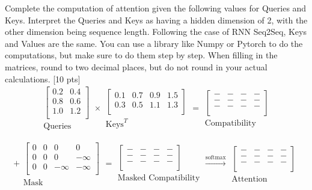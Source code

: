 \documentclass[11pt]{article}
\begin{document}
\vspace{2em}
 Complete the computation of attention given the following values for Queries and Keys. Interpret the Queries and Keys as having a hidden dimension of 2, with the other dimension being sequence length. Following the case of RNN Seq2Seq, Keys and Values are the same. You can use a library like Numpy or Pytorch to do the computations, but make sure to do them step by step. When filling in the matrices, round to two decimal places, but do not round in your actual calculations. \hfill [10 pts]
\[
\begin{array}{c}
\begin{bmatrix}
0.2 & 0.4 \\
0.8 & 0.6 \\
1.0 & 1.2 \\
\end{bmatrix}\\
\text{Queries}
\end{array}
\times
\begin{array}{c}
\begin{bmatrix}
0.1 & 0.7 & 0.9 & 1.5\\
0.3 & 0.5 & 1.1 & 1.3\\
\end{bmatrix}\\
\text{Keys}^T
\end{array}
=
\begin{array}{c}
\begin{bmatrix}
- & - & - & - \\
- & - & - & - \\
- & - & - & - \\
\end{bmatrix}\\
\text{Compatibility}
\end{array}
\]

\[
+
\begin{array}{c}
\begin{bmatrix}
0 & 0 & 0 & 0 \\
0 & 0 & 0 & -\infty \\
0 & 0 & -\infty & -\infty \\
\end{bmatrix}\\
\text{Mask}
\end{array}
=
\begin{array}{c}
\begin{bmatrix}
- & - & - & - \\
- & - & - & - \\
- & - & - & - \\
\end{bmatrix}\\
\text{Masked Compatibility}
\end{array}
\xrightarrow{\text{softmax}}
\begin{array}{c}
\begin{bmatrix}
- & - & - & - \\
- & - & - & - \\
- & - & - & - \\
\end{bmatrix}\\
\text{Attention}
\end{array}
\]
\end{document}
